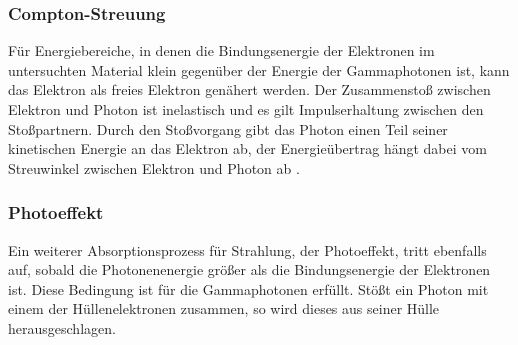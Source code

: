 \subsubsection{Compton-Streuung}
\noindent Für Energiebereiche, in denen die Bindungsenergie der Elektronen im
untersuchten Material klein gegenüber der Energie der Gammaphotonen ist, kann
das Elektron als freies Elektron genähert werden. Der Zusammenstoß zwischen
Elektron und Photon ist inelastisch und es gilt Impulserhaltung zwischen den
Stoßpartnern. Durch den Stoßvorgang gibt das Photon einen Teil seiner
kinetischen Energie an das Elektron ab, der Energieübertrag hängt dabei vom
Streuwinkel zwischen Elektron und Photon ab \cite{demtroeder_3}. \\
\subsubsection{Photoeffekt}
\noindent Ein weiterer Absorptionsprozess für Strahlung, der Photoeffekt, tritt
ebenfalls auf, sobald die Photonenenergie größer als die Bindungsenergie der
Elektronen ist. Diese Bedingung ist für die Gammaphotonen erfüllt. Stößt ein
Photon mit einem der Hüllenelektronen zusammen, so wird dieses aus seiner Hülle
herausgeschlagen. \\

